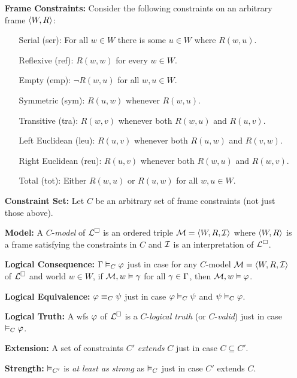 \documentclass[a4paper, 11pt]{article} %
\begin{document}
\begin{enumerate}[leftmargin=1.2in] %
  \item[\bf Frame Constraints:]
    Consider the following constraints on an arbitrary frame $\tuple{W, R}$:
    \begin{itemize}
      \item[\sc Serial (ser):] For all $w \in W$ there is some $u \in W$ where $R(w,u)$.
      \item[\sc Reflexive (ref):] $R(w,w)$ for every $w\in W$.
      \item[\sc Empty (emp):] $\neg R(w,u)$ for all $w, u\in W$.
      \item[\sc Symmetric (sym):] $R(u,w)$ whenever $R(w,u)$. 
      \item[\sc Transitive (tra):] $R(w,v)$ whenever both $R(w,u)$ and $R(u,v)$. 
      \item[\sc Left Euclidean (leu):] $R(u,v)$ whenever both $R(u,w)$ and $R(v,w)$. 
      \item[\sc Right Euclidean (reu):] $R(u,v)$ whenever both $R(w,u)$ and $R(w,v)$. 
      \item[\sc Total (tot):] Either $R(w,u)$ or $R(u,w)$ for all $w,u \in W$. 
    \end{itemize}
  \item[\bf Constraint Set:] Let $C$ be an arbitrary set of frame constraints (not just those above).
	\item[\bf Model:] A $C$-\textit{model} of $\ML$ is an ordered triple $\M = \tuple{W, R, \I}$ where $\tuple{W, R}$ is a frame satisfying the constraints in $C$ and $\I$ is an interpretation of $\ML$.
  \item[\bf Logical Consequence:] $\MetaG \MLmodels[C] \metaA$ just in case for any $C$-model $\M = \tuple{W, R, \I}$ of $\ML$ and world $w \in W$, if $\M, w \vDash \metaG$ for all $\metaG \in \MetaG$, then $\M, w \vDash \metaA$.
  \item[\bf Logical Equivalence:] $\metaA \MLequiv[C] \metaB$ just in case $\metaA \MLmodels[C] \metaB$ and $\metaB \MLmodels[C] \metaA$.
  \item[\bf Logical Truth:] A wfs $\metaA$ of $\ML$ is a $C$-\textit{logical truth} (or $C$-\textit{valid}) just in case $\MLmodels[C] \metaA$.
  \item[\bf Extension:] A set of constraints $C'$ \textit{extends} $C$ just in case $C \subseteq C'$. 
  \item[\bf Strength:] $\MLmodels[C']$ is \textit{at least as strong} as $\MLmodels[C]$ just in case $C'$ extends $C$. 

\end{enumerate}
\end{document}
